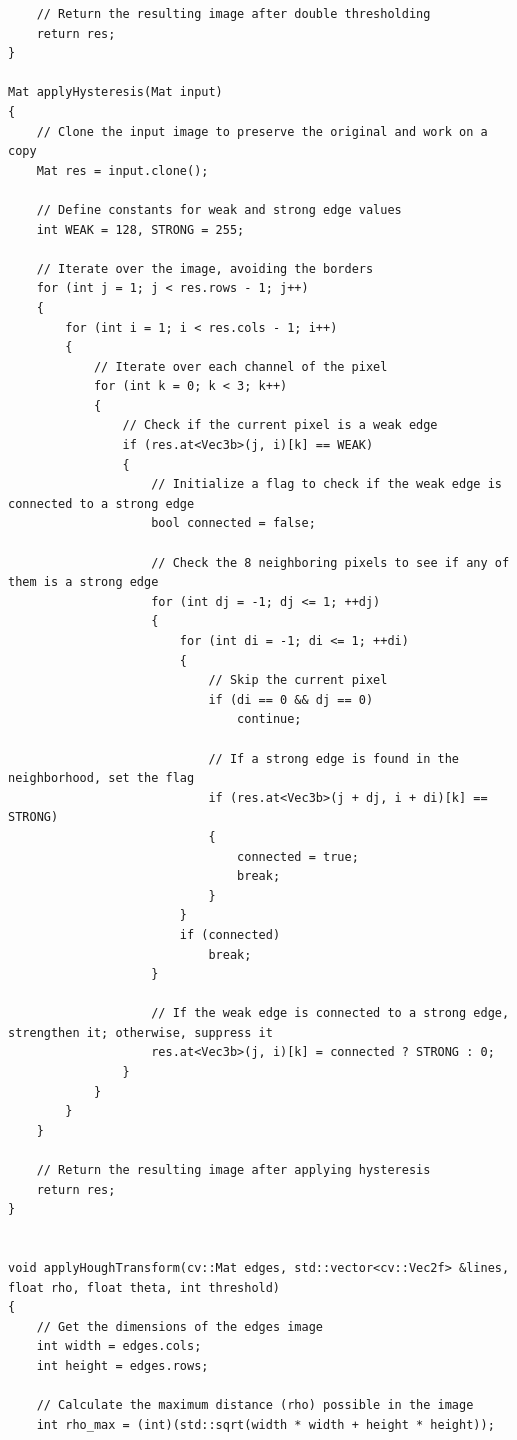 \documentclass[12pt,a4paper]{report}
\begin{document}
\begin{lstlisting}
    // Return the resulting image after double thresholding
    return res;
}

Mat applyHysteresis(Mat input)
{
    // Clone the input image to preserve the original and work on a copy
    Mat res = input.clone();

    // Define constants for weak and strong edge values
    int WEAK = 128, STRONG = 255;

    // Iterate over the image, avoiding the borders
    for (int j = 1; j < res.rows - 1; j++)
    {
        for (int i = 1; i < res.cols - 1; i++)
        {
            // Iterate over each channel of the pixel
            for (int k = 0; k < 3; k++)
            {
                // Check if the current pixel is a weak edge
                if (res.at<Vec3b>(j, i)[k] == WEAK)
                {
                    // Initialize a flag to check if the weak edge is connected to a strong edge
                    bool connected = false;

                    // Check the 8 neighboring pixels to see if any of them is a strong edge
                    for (int dj = -1; dj <= 1; ++dj)
                    {
                        for (int di = -1; di <= 1; ++di)
                        {
                            // Skip the current pixel
                            if (di == 0 && dj == 0)
                                continue;

                            // If a strong edge is found in the neighborhood, set the flag
                            if (res.at<Vec3b>(j + dj, i + di)[k] == STRONG)
                            {
                                connected = true;
                                break;
                            }
                        }
                        if (connected)
                            break;
                    }

                    // If the weak edge is connected to a strong edge, strengthen it; otherwise, suppress it
                    res.at<Vec3b>(j, i)[k] = connected ? STRONG : 0;
                }
            }
        }
    }

    // Return the resulting image after applying hysteresis
    return res;
}


void applyHoughTransform(cv::Mat edges, std::vector<cv::Vec2f> &lines, float rho, float theta, int threshold)
{
    // Get the dimensions of the edges image
    int width = edges.cols;
    int height = edges.rows;

    // Calculate the maximum distance (rho) possible in the image
    int rho_max = (int)(std::sqrt(width * width + height * height));


\end{lstlisting}
\end{document}
